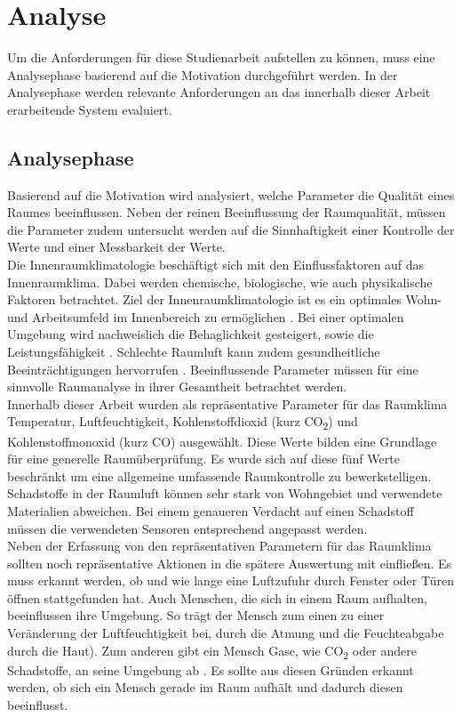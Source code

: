 \chapter{Analyse} %
Um die Anforderungen für diese Studienarbeit aufstellen zu können, muss eine Analysephase basierend auf die Motivation durchgeführt werden. In der Analysephase werden relevante Anforderungen an das innerhalb dieser Arbeit erarbeitende System evaluiert.
\section{Analysephase} \label{sec:Anforderungen}
Basierend auf die Motivation wird analysiert, welche Parameter die Qualität eines Raumes beeinflussen. Neben der reinen Beeinflussung der Raumqualität, müssen die Parameter zudem untersucht werden auf die Sinnhaftigkeit einer Kontrolle der Werte und einer Messbarkeit der Werte.\\
Die Innenraumklimatologie beschäftigt sich mit den Einflussfaktoren auf das Innenraumklima. Dabei werden chemische, biologische, wie auch physikalische Faktoren betrachtet. Ziel der Innenraumklimatologie ist es ein optimales Wohn- und Arbeitsumfeld im Innenbereich zu ermöglichen \cite{raumluft:Innenraumklimatologie}. Bei einer optimalen Umgebung wird nachweislich die Behaglichkeit gesteigert, sowie die Leistungsfähigkeit \cite{Raumklimatechnik}. Schlechte Raumluft kann zudem gesundheitliche Beeinträchtigungen hervorrufen \cite{raumluft:InnenluftqualitaetundGesundheit}. Beeinflussende Parameter müssen für eine sinnvolle Raumanalyse in ihrer Gesamtheit betrachtet werden.\\
Innerhalb dieser Arbeit wurden als repräsentative Parameter für das Raumklima Temperatur, Luftfeuchtigkeit, Kohlenstoffdioxid (kurz CO\textsubscript{2}) und Kohlenstoffmonoxid (kurz CO) ausgewählt. Diese Werte bilden eine Grundlage für eine generelle Raumüberprüfung. Es wurde sich auf diese fünf Werte beschränkt um eine allgemeine umfassende Raumkontrolle zu bewerkstelligen. Schadstoffe in der Raumluft können sehr stark von Wohngebiet und verwendete Materialien abweichen. Bei einem genaueren Verdacht auf einen Schadstoff müssen die verwendeten Sensoren entsprechend angepasst werden.\\
Neben der Erfassung von den repräsentativen Parametern für das Raumklima sollten noch repräsentative Aktionen in die spätere Auswertung mit einfließen. Es muss erkannt werden, ob und wie lange eine Luftzufuhr durch Fenster oder Türen öffnen stattgefunden hat. Auch Menschen, die sich in einem Raum aufhalten, beeinflussen ihre Umgebung. So trägt der Mensch zum einen zu einer Veränderung der Luftfeuchtigkeit bei, durch die Atmung und die Feuchteabgabe durch die Haut). Zum anderen gibt ein Mensch Gase, wie CO\textsubscript{2} oder andere Schadstoffe, an seine Umgebung ab \cite{raumluft:Luftmengen}. Es sollte aus diesen Gründen erkannt werden, ob sich ein Mensch gerade im Raum aufhält und dadurch diesen beeinflusst.\\
